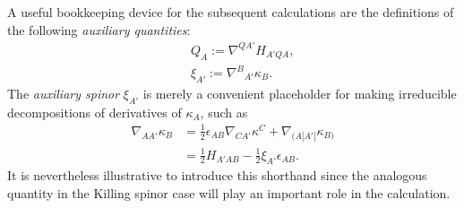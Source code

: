 \documentclass[10pt,a4paper]{article}
\theoremstyle{plain}
\begin{document}
 A useful bookkeeping device for the subsequent
calculations are the definitions of the following \emph{auxiliary quantities}:
\begin{subequations}\label{def_twistor_aux_quants}
  \begin{eqnarray}
      && Q_{A}  := \nabla^{QA'}H_{A'QA}, \label{def_Q_twistor} \\
      && \xi_{A'} := \nabla^B{}_{A'}\kappa_B. \label{def_xi_twistor}
  \end{eqnarray}
\end{subequations}
  The \emph{auxiliary spinor} $\xi_{A'}$ is merely a convenient
  placeholder for making irreducible decompositions of derivatives of
  $\kappa_A$, such as
  \begin{align}\label{decomp_Der_kappa}
    \nabla_{AA'}\kappa _{B} & = \tfrac{1}{2} \epsilon _{AB}
    \nabla_{CA'}\kappa ^{C} + \nabla_{(A|A'|}\kappa _{B)}\nonumber
 \\ & = \tfrac{1}{2} H_{A'AB} - \tfrac{1}{2} \xi _{A'} \epsilon_{AB}.
  \end{align}
It is nevertheless illustrative to introduce this
  shorthand since the analogous quantity in the Killing spinor case
  will play an important role in the calculation.

  \medskip
  
\end{document}

